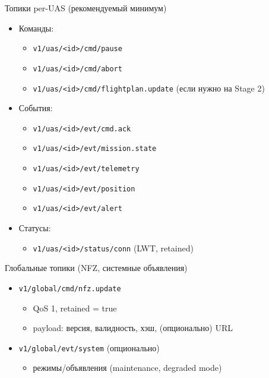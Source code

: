 \documentclass[aspectratio=169]{beamer}
\begin{document}
\begin{frame}[fragile]{Топики per-UAS (рекомендуемый минимум)}
\begin{itemize}
  \item Команды:
  \begin{itemize}
    \item \texttt{v1/uas/<id>/cmd/pause}
    \item \texttt{v1/uas/<id>/cmd/abort}
    \item \texttt{v1/uas/<id>/cmd/flightplan.update} (если нужно на Stage 2)
  \end{itemize}
  \item События:
  \begin{itemize}
    \item \texttt{v1/uas/<id>/evt/cmd.ack}
    \item \texttt{v1/uas/<id>/evt/mission.state}
    \item \texttt{v1/uas/<id>/evt/telemetry}
    \item \texttt{v1/uas/<id>/evt/position}
    \item \texttt{v1/uas/<id>/evt/alert}
  \end{itemize}
  \item Статусы:
  \begin{itemize}
    \item \texttt{v1/uas/<id>/status/conn} (LWT, retained)
  \end{itemize}
\end{itemize}
\end{frame}

\begin{frame}[fragile]{Глобальные топики (NFZ, системные объявления)}
\begin{itemize}
  \item \texttt{v1/global/cmd/nfz.update}
  \begin{itemize}
    \item QoS 1, retained = true
    \item payload: версия, валидность, хэш, (опционально) URL
  \end{itemize}
  \item \texttt{v1/global/evt/system} (опционально)
  \begin{itemize}
    \item режимы/объявления (maintenance, degraded mode)
  \end{itemize}
\end{itemize}
\end{frame}
\end{document}
